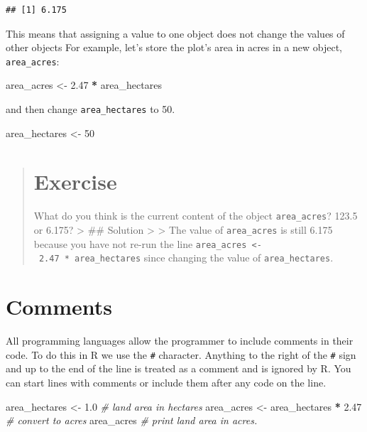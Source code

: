 \documentclass[]{book}
\newenvironment{Shaded}{\begin{snugshade}}{\end{snugshade}}
\newcommand{\DecValTok}[1]{\textcolor[rgb]{0.00,0.00,0.81}{#1}}
\newcommand{\FloatTok}[1]{\textcolor[rgb]{0.00,0.00,0.81}{#1}}
\newcommand{\StringTok}[1]{\textcolor[rgb]{0.31,0.60,0.02}{#1}}
\newcommand{\CommentTok}[1]{\textcolor[rgb]{0.56,0.35,0.01}{\textit{#1}}}
\newcommand{\OperatorTok}[1]{\textcolor[rgb]{0.81,0.36,0.00}{\textbf{#1}}}
\newcommand{\NormalTok}[1]{#1}
\begin{document}
\begin{verbatim}
## [1] 6.175
\end{verbatim}

This means that assigning a value to one object does not change the
values of other objects For example, let's store the plot's area in
acres in a new object, \texttt{area\_acres}:

\begin{Shaded}
\begin{Highlighting}[]
\NormalTok{area_acres <-}\StringTok{ }\FloatTok{2.47} \OperatorTok{*}\StringTok{ }\NormalTok{area_hectares}
\end{Highlighting}
\end{Shaded}

and then change \texttt{area\_hectares} to 50.

\begin{Shaded}
\begin{Highlighting}[]
\NormalTok{area_hectares <-}\StringTok{ }\DecValTok{50}
\end{Highlighting}
\end{Shaded}

\begin{quote}
\section{Exercise}\label{exercise-1}

What do you think is the current content of the object
\texttt{area\_acres}? 123.5 or 6.175? \textgreater{} \#\# Solution
\textgreater{} \textgreater{} The value of \texttt{area\_acres} is still
6.175 because you have not re-run the line
\texttt{area\_acres\ \textless{}-\ 2.47\ *\ area\_hectares} since
changing the value of \texttt{area\_hectares}.
\end{quote}

\section{Comments}\label{comments}

All programming languages allow the programmer to include comments in
their code. To do this in R we use the \texttt{\#} character. Anything
to the right of the \texttt{\#} sign and up to the end of the line is
treated as a comment and is ignored by R. You can start lines with
comments or include them after any code on the line.

\begin{Shaded}
\begin{Highlighting}[]
\NormalTok{area_hectares <-}\StringTok{ }\FloatTok{1.0}            \CommentTok{# land area in hectares}
\NormalTok{area_acres <-}\StringTok{ }\NormalTok{area_hectares }\OperatorTok{*}\StringTok{ }\FloatTok{2.47}  \CommentTok{# convert to acres}
\NormalTok{area_acres              }\CommentTok{# print land area in acres.}
\end{Highlighting}
\end{Shaded}
\end{document}
